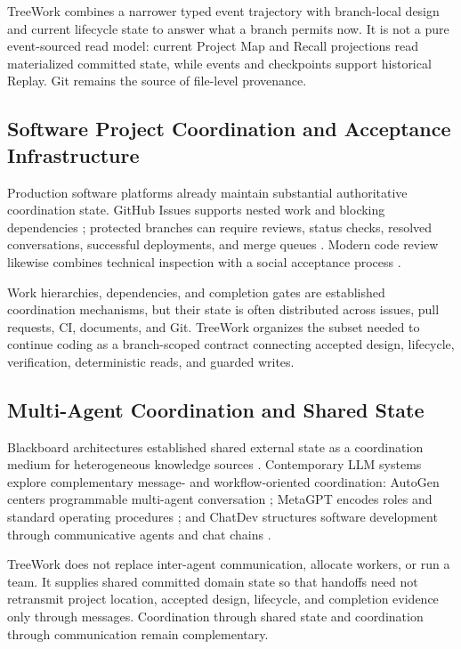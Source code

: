 \documentclass[11pt]{article}
\theoremstyle{definition}
\begin{document}
TreeWork combines a narrower typed event trajectory with branch-local design
and current lifecycle state to answer what a branch permits now.  It is not a
pure event-sourced read model: current Project Map and Recall projections read
materialized committed state, while events and checkpoints support historical
Replay.  Git remains the source of file-level provenance.

\subsection{Software Project Coordination and Acceptance Infrastructure}

Production software platforms already maintain substantial authoritative
coordination state.  GitHub Issues supports nested work and blocking
dependencies \citep{github2026issues}; protected branches can require reviews,
status checks, resolved conversations, successful deployments, and merge queues
\citep{github2026protected}.  Modern code review likewise combines technical
inspection with a social acceptance process \citep{sadowski2018review}.

Work hierarchies, dependencies, and completion gates are established
coordination mechanisms, but their state is often distributed across issues,
pull requests, CI, documents, and Git.  TreeWork organizes the subset needed to
continue coding as a branch-scoped contract connecting accepted design,
lifecycle, verification, deterministic reads, and guarded writes.

\subsection{Multi-Agent Coordination and Shared State}

Blackboard architectures established shared external state as a coordination
medium for heterogeneous knowledge sources \citep{hayesroth1985blackboard}.
Contemporary LLM systems explore complementary message- and workflow-oriented
coordination: AutoGen centers programmable multi-agent conversation
\citep{wu2023autogen}; MetaGPT encodes roles and standard operating procedures
\citep{hong2023metagpt}; and ChatDev structures software development through
communicative agents and chat chains \citep{qian2024chatdev}.

TreeWork does not replace inter-agent communication, allocate workers, or run a
team.  It supplies shared committed domain state so that handoffs need not
retransmit project location, accepted design, lifecycle, and completion evidence
only through messages.  Coordination through shared state and coordination
through communication remain complementary.
\end{document}
